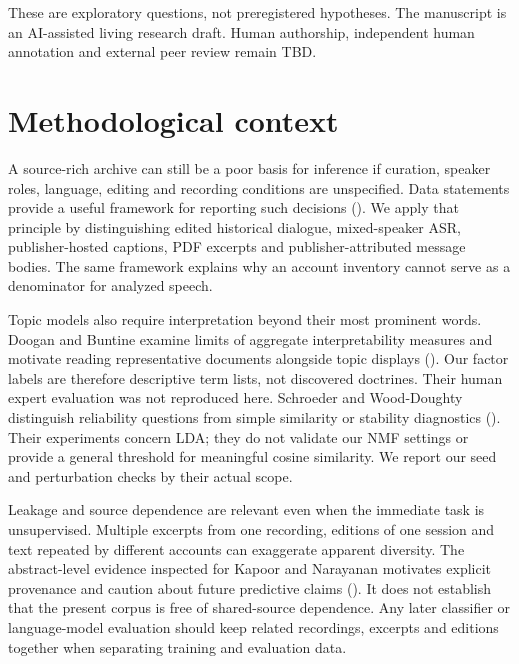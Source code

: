 \documentclass[
  11pt,
]{article}
\begin{document}
These are exploratory questions, not preregistered hypotheses. The
manuscript is an AI-assisted living research draft. Human authorship,
independent human annotation and external peer review remain TBD.

\FloatBarrier

\section{Methodological context}\label{methodological-context}

A source-rich archive can still be a poor basis for inference if
curation, speaker roles, language, editing and recording conditions are
unspecified. Data statements provide a useful framework for reporting
such decisions (). We
apply that principle by distinguishing edited historical dialogue,
mixed-speaker ASR, publisher-hosted captions, PDF excerpts and
publisher-attributed message bodies. The same framework explains why an
account inventory cannot serve as a denominator for analyzed speech.

Topic models also require interpretation beyond their most prominent
words. Doogan and Buntine examine limits of aggregate interpretability
measures and motivate reading representative documents alongside topic
displays (). Our
factor labels are therefore descriptive term lists, not discovered
doctrines. Their human expert evaluation was not reproduced here.
Schroeder and Wood-Doughty distinguish reliability questions from simple
similarity or stability diagnostics
(). Their
experiments concern LDA; they do not validate our NMF settings or
provide a general threshold for meaningful cosine similarity. We report
our seed and perturbation checks by their actual scope.

Leakage and source dependence are relevant even when the immediate task
is unsupervised. Multiple excerpts from one recording, editions of one
session and text repeated by different accounts can exaggerate apparent
diversity. The abstract-level evidence inspected for Kapoor and
Narayanan motivates explicit provenance and caution about future
predictive claims (). It does not establish that the present corpus is free of
shared-source dependence. Any later classifier or language-model
evaluation should keep related recordings, excerpts and editions
together when separating training and evaluation data.
\end{document}
